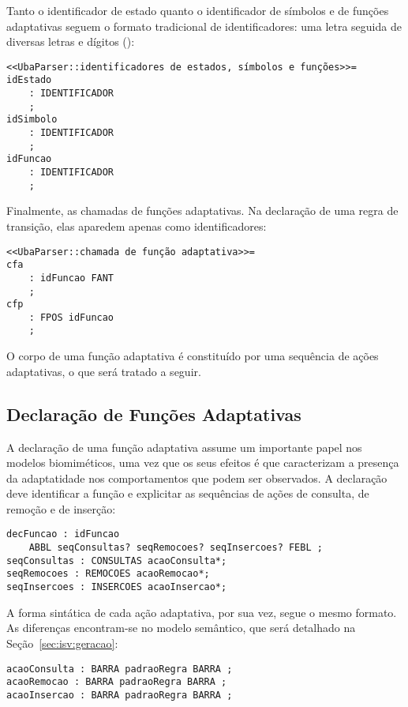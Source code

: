\noindent
Tanto o identificador de estado quanto o identificador de símbolos e de funções adaptativas seguem o formato tradicional de identificadores: uma letra seguida de diversas letras e dígitos ():

\begin{lstlisting}[style=antlr]
<<UbaParser::identificadores de estados, símbolos e funções>>=
idEstado
    : IDENTIFICADOR
    ;
idSimbolo
    : IDENTIFICADOR
    ;
idFuncao
    : IDENTIFICADOR
    ;
\end{lstlisting}

Finalmente, as chamadas de funções adaptativas. Na declaração de uma regra de transição, elas aparedem apenas como identificadores:

\begin{lstlisting}[style=antlr]
<<UbaParser::chamada de função adaptativa>>=
cfa
    : idFuncao FANT
    ;
cfp
    : FPOS idFuncao
    ;
\end{lstlisting}

\noindent
O corpo de uma função adaptativa é constituído por uma sequência de ações adaptativas, o que será tratado a seguir.

\subsection*{Declaração de Funções Adaptativas}

A declaração de uma função adaptativa assume um importante papel nos modelos biomiméticos, uma vez que os seus efeitos é que caracterizam a presença da adaptatidade nos comportamentos que podem ser observados. A declaração deve identificar a função e explicitar as sequências de ações de consulta, de remoção e de inserção:

\begin{lstlisting}[style=antlr]
decFuncao : idFuncao
	ABBL seqConsultas? seqRemocoes? seqInsercoes? FEBL ;
seqConsultas : CONSULTAS acaoConsulta*;
seqRemocoes : REMOCOES acaoRemocao*;
seqInsercoes : INSERCOES acaoInsercao*;
\end{lstlisting}

A forma sintática de cada ação adaptativa, por sua vez, segue o mesmo formato. As diferenças encontram-se no modelo semântico, que será detalhado na Seção~\ref{sec:isv:geracao}:

\begin{lstlisting}[style=antlr]
acaoConsulta : BARRA padraoRegra BARRA ;
acaoRemocao : BARRA padraoRegra BARRA ;
acaoInsercao : BARRA padraoRegra BARRA ;
\end{lstlisting}

